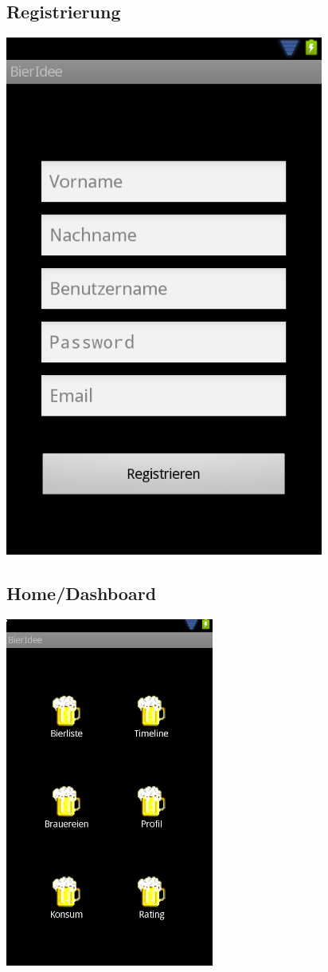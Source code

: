 \documentclass[10pt,a4paper]{scrartcl}
\begin{document}
\subsection{Registrierung}
\includegraphics[scale=.3]{registrierung-screen.png}

\subsection{Home/Dashboard}
\includegraphics[scale=.5]{home-screen.png}
\end{document}
